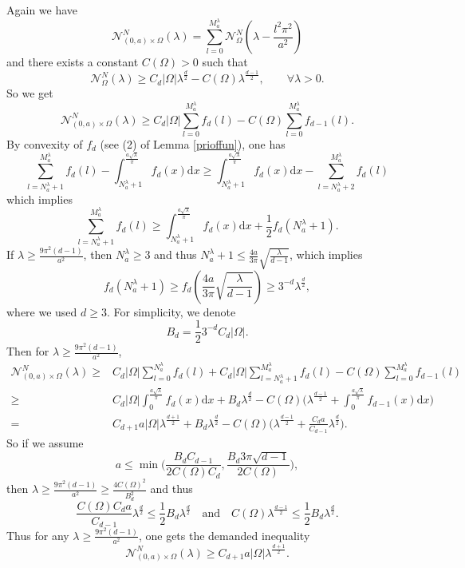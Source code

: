 \documentclass[11pt,letterpaper]{amsart}
\numberwithin{equation}{section}
\theoremstyle{plain}
\theoremstyle{plain}
\numberwithin{equation}{section}
\theoremstyle{remark}
\begin{document}
	Again we have 
	\begin{equation*} \label{88}
		\mathcal{N}^N_{(0,a)\times \Omega}(\lambda)=\sum_{l=0}^{M_a^\lambda}\mathcal{N}^N_\Omega(\lambda-\frac{l^2\pi^2}{a^2})
	\end{equation*} 
	and there exists a constant $C(\Omega)>0$ such that 
	\[
	\mathcal N^N_\Omega(\lambda)\ge C_d|\Omega|\lambda^{\frac{d}{2}}- C(\Omega)\lambda^{\frac{d-1}{2}},\qquad \forall \lambda>0.
	\] 
	So we get
	\begin{equation}\label{dim3Neu}
		\mathcal{N}^N_{(0,a)\times \Omega}(\lambda)
		\ge 
		C_d|\Omega| \sum_{l=0}^{M_a^\lambda} f_d(l)-C(\Omega)\sum_{l=0}^{M_a^\lambda} f_{d-1}(l).
	\end{equation}
	By convexity of $f_d$ (see (2) of Lemma \ref{prioffun}), one has 
	\[\sum_{l=N_a^\lambda+1}^{M_a^\lambda} f_d(l) -\int_{N_a^\lambda+1}^{\frac{a\sqrt\lambda}{\pi}} f_d(x) \mathrm{d}x
	\ge \int_{N_a^\lambda+1}^{\frac{a\sqrt\lambda}{\pi}} f_d(x)\mathrm{d}x- \sum_{l=N_a^\lambda+2}^{M_a^\lambda}f_d(l)
	\]
	which implies
	\[
	\sum_{l=N_a^\lambda+1}^{M_a^\lambda}f_d(l)
	\ge  \int_{N_a^\lambda+1}^{\frac{a\sqrt\lambda}{\pi}} f_d(x) \mathrm{d}x+ \frac{1}{2}f_d(N_a^\lambda+1).
	\]
	If $\lambda \ge \frac{9\pi^2(d-1)}{a^2}$, then $N_a^\lambda \ge 3$ and thus $N_a^\lambda+1 \le \frac{4a}{3\pi}\sqrt{\frac{\lambda}{d-1}}$, which implies
	\[
	f_d(N_a^\lambda+1) \ge	f_d(\frac{4a}{3\pi}\sqrt{\frac{\lambda}{d-1}}) \ge 3^{-{d}}\lambda^{\frac{d}{2}},
	\]
	where we used $d\ge 3$.   For simplicity, we denote 
	\[
	B_d= \frac{1}{2}3^{-d}C_d|\Omega|.
	\] 
	Then for $\lambda \ge \frac{9\pi^2(d-1)}{a^2}$,  
	\[
	\begin{aligned}
		\mathcal{N}^N_{(0,a)\times \Omega}(\lambda)
		\ge & C_d|\Omega|\sum_{l=0}^{N_a^\lambda}f_d(l) +C_d |\Omega|\sum_{l=N_a^\lambda +1}^{M_a^\lambda} f_d(l)- C(\Omega)\sum_{l=0}^{M_a^\lambda}f_{d-1}(l)\\
		\ge & C_d|\Omega| \int_0^{\frac{a\sqrt\lambda}{\pi}}\!\!\!f_d(x) \mathrm{d}x+ B_d\lambda^{\frac{d}{2}}- C(\Omega)\big(\lambda^{\frac{d-1}{2}}+ \int_0^{{\frac{a\sqrt\lambda}{\pi}}}\!\!\! f_{d-1}(x) \mathrm{d}x\big)\\
		= & C_{d+1}a|\Omega|\lambda^{\frac{d+1}{2}}+ B_d\lambda^{\frac{d}{2}}- C(\Omega)\big(\lambda^{\frac{d-1}{2}}+ \frac{C_d a}{C_{d-1}}\lambda^{\frac{d}{2}}\big).
	\end{aligned}
	\]
	So if  we assume \[
	a\le \min\bigg(\frac{B_d C_{d-1}}{2C(\Omega) C_d}, \frac{B_d3\pi\sqrt{d-1}}{2C(\Omega)}\bigg),
	\] 
	then $ \lambda \ge \frac{9\pi^2(d-1)}{a^2}\ge \frac{4C(\Omega)^2}{B_d^2}$ and thus 
	\[
	\frac{C(\Omega) C_d a}{C_{d-1}}\lambda^{\frac{d}{2}}\le \frac{1}{2}B_d\lambda^{\frac{d}{2}} \quad \text{and} \quad  C(\Omega)\lambda^{\frac{d-1}{2}} \le \frac{1}{2}B_d\lambda^{\frac{d}{2}}.
	\] 
	Thus for any $\lambda\ge \frac{9\pi^2(d-1)}{a^2}$, one gets the demanded inequality
	\[
	\mathcal{N}^N_{(0,a)\times \Omega}(\lambda)\ge C_{d+1}a |\Omega|\lambda^{\frac{d+1}{2}}.
	\]
	
\end{document}
